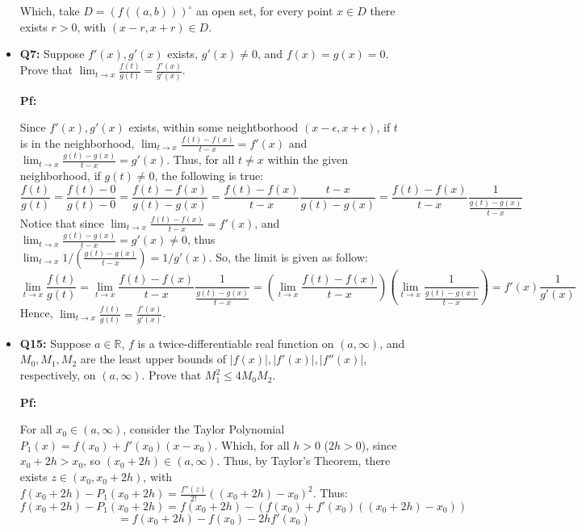 \documentclass{article}
\begin{document}
\begin{itemize}
    Which, take $D=(f((a,b)))^\circ$ an open set, for every point $x\in D$ there exists $r>0$, with $(x-r,x+r)\in D$.


    \hfill

    \item \begin{myBox}[]{}
        \textbf{Q7:} Suppose $f'(x), g'(x)$ exists, $g'(x)\neq 0$, and $f(x)=g(x)=0$. Prove that $\lim_{t\rightarrow x}\frac{f(t)}{g(t)}=\frac{f'(x)}{g'(x)}$. 
    \end{myBox}

    \textbf{Pf:}

    Since $f'(x), g'(x)$ exists, within some neightborhood $(x-\epsilon,x+\epsilon)$, if $t$ is in the neighborhood, $\lim_{t\rightarrow x}\frac{f(t)-f(x)}{t-x}=f'(x)$ and $\lim_{t\rightarrow x}\frac{g(t)-g(x)}{t-x}=g'(x)$.
    Thus, for all $t\neq x$ within the given neighborhood, if $g(t)\neq 0$, the following is true:
    $$\frac{f(t)}{g(t)}=\frac{f(t)-0}{g(t)-0}=\frac{f(t)-f(x)}{g(t)-g(x)} = \frac{f(t)-f(x)}{t-x}\frac{t-x}{g(t)-g(x)} = \frac{f(t)-f(x)}{t-x}\frac{1}{\frac{g(t)-g(x)}{t-x}}$$
    Notice that since $\lim_{t\rightarrow x}\frac{f(t)-f(x)}{t-x}=f'(x)$, and $\lim_{t\rightarrow x}\frac{g(t)-g(x)}{t-x}=g'(x)\neq 0$, thus $\lim_{t\rightarrow x}1/\left(\frac{g(t)-g(x)}{t-x}\right)=1/g'(x)$. So, the limit is given as follow:
    $$\lim_{t\rightarrow x}\frac{f(t)}{g(t)}= \lim_{t\rightarrow x}\frac{f(t)-f(x)}{t-x}\frac{1}{\frac{g(t)-g(x)}{t-x}} = \left(\lim_{t\rightarrow x}\frac{f(t)-f(x)}{t-x}\right)\left(\lim_{t\rightarrow x}\frac{1}{\frac{g(t)-g(x)}{t-x}}\right) = f'(x)\frac{1}{g'(x)}$$
    Hence, $\lim_{t\rightarrow x}\frac{f(t)}{g(t)}=\frac{f'(x)}{g'(x)}$.

    \hfill

    \item \begin{myBox}[]{}
        \textbf{Q15:} Suppose $a\in\mathbb{R}$, $f$ is a twice-differentiable real function on $(a,\infty)$, and $M_0,M_1,M_2$ are the least upper bounds of $|f(x)|,|f'(x)|,|f''(x)|$, respectively, on $(a,\infty)$. 
        Prove that $M_1^2\leq 4M_0M_2$.
    \end{myBox}

    \textbf{Pf:}

    For all $x_0\in (a,\infty)$, consider the Taylor Polynomial $P_1(x)=f(x_0)+f'(x_0)(x-x_0)$. Which, for all $h>0$ ($2h>0$), since $x_0+2h>x_0$, so $(x_0+2h)\in (a,\infty)$. 
    Thus, by Taylor's Theorem, there exists $z\in (x_0,x_0+2h)$, with $f(x_0+2h)-P_1(x_0+2h)=\frac{f''(z)}{2!}((x_0+2h)-x_0)^2$. Thus:
    $$f(x_0+2h)-P_1(x_0+2h)=f(x_0+2h)-\left(f(x_0)+f'(x_0)((x_0+2h)-x_0)\right)$$
    $$=f(x_0+2h)-f(x_0)-2hf'(x_0)$$


\end{itemize}
\end{document}
